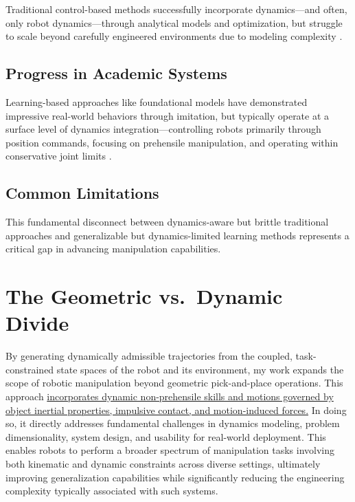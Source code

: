 Traditional control-based methods successfully incorporate dynamics---and often, only robot dynamics---through analytical models and optimization, but struggle to scale beyond carefully engineered environments due to modeling complexity \cite{feng2014optimization,gamba2023springy}.

\subsection{Progress in Academic Systems}
\label{sec:intro:academic}

Learning-based approaches like foundational models have demonstrated impressive real-world behaviors through imitation, but typically operate at a surface level of dynamics integration---controlling robots primarily through position commands, focusing on prehensile manipulation, and operating within conservative joint limits \cite{chi2023diffusion,team2024octo}.

\subsection{Common Limitations}
\label{sec:intro:limitations}

This fundamental disconnect between dynamics-aware but brittle traditional approaches and generalizable but dynamics-limited learning methods represents a critical gap in advancing manipulation capabilities.

\section{The Geometric vs.\ Dynamic Divide}
\label{sec:intro:divide}

By generating dynamically admissible trajectories from the coupled, task-constrained state spaces of the robot and its environment, my work expands the scope of robotic manipulation beyond geometric pick-and-place operations. This approach \ul{incorporates dynamic non-prehensile skills and motions governed by object inertial properties, impulsive contact, and motion-induced forces.} In doing so, it directly addresses fundamental challenges in dynamics modeling, problem dimensionality, system design, and usability for real-world deployment.
This enables robots to perform a broader spectrum of manipulation tasks involving both kinematic and dynamic constraints across diverse settings, ultimately improving generalization capabilities while significantly reducing the engineering complexity typically associated with such systems.


